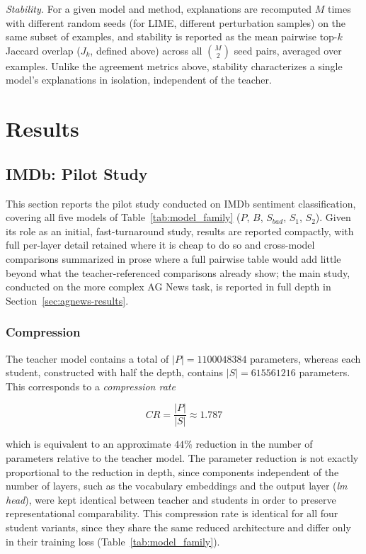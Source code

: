 \documentclass[conference]{IEEEtran}
\begin{document}
\textit{Stability.} For a given model and method, explanations are recomputed $M$ times with different random seeds (for LIME, different perturbation samples) on the same subset of examples, and stability is reported as the mean pairwise top-$k$ Jaccard overlap ($J_k$, defined above) across all $\binom{M}{2}$ seed pairs, averaged over examples. Unlike the agreement metrics above, stability characterizes a single model's explanations in isolation, independent of the teacher.

\section{Results}

\subsection{IMDb: Pilot Study}\label{sec:imdb-results}

This section reports the pilot study conducted on IMDb sentiment classification, covering all five models of Table~\ref{tab:model_family} ($P$, $B$, $S_{bad}$, $S_1$, $S_2$). Given its role as an initial, fast-turnaround study, results are reported compactly, with full per-layer detail retained where it is cheap to do so and cross-model comparisons summarized in prose where a full pairwise table would add little beyond what the teacher-referenced comparisons already show; the main study, conducted on the more complex AG News task, is reported in full depth in Section~\ref{sec:agnews-results}.

\subsubsection{Compression}

The teacher model contains a total of $|P| = 1100048384$ parameters, whereas each student, constructed with half the depth, contains $|S| = 615561216$ parameters. This corresponds to a \textit{compression rate}

\[
CR = \frac{|P|}{|S|} \approx 1.787
\]

which is equivalent to an approximate $44\%$ reduction in the number of parameters relative to the teacher model. The parameter reduction is not exactly proportional to the reduction in depth, since components independent of the number of layers, such as the vocabulary embeddings and the output layer (\textit{lm head}), were kept identical between teacher and students in order to preserve representational comparability. This compression rate is identical for all four student variants, since they share the same reduced architecture and differ only in their training loss (Table~\ref{tab:model_family}).
\end{document}
